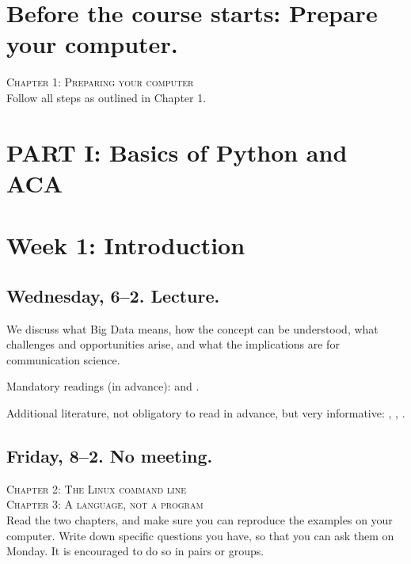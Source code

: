 \section*{Before the course starts: Prepare your computer.}
\textsc{ Chapter 1: Preparing your computer}\\
Follow all steps as outlined in Chapter 1.


\section*{PART I: Basics of Python and ACA}

\section*{Week 1: Introduction}
\subsection*{Wednesday, 6--2. Lecture.}
We discuss what Big Data means, how the concept can be understood, what challenges and opportunities arise, and what the implications are for communication science. 

Mandatory readings (in advance): \cite{boyd2012} and \cite{Kitchin2014}. 

Additional literature, not obligatory to read in advance, but very informative: \cite{Mahrt2013}, \cite{Vis2013}, \cite{Trilling2017a}.



\subsection*{Friday, 8--2. No meeting.}
\textsc{ Chapter 2: The Linux command line}\\
\textsc{ Chapter 3: A language, not a program}\\

Read the two chapters, and make sure you can reproduce the examples on your computer. Write down specific questions you have, so that you can ask them on Monday. It is encouraged to do so in pairs or groups.





